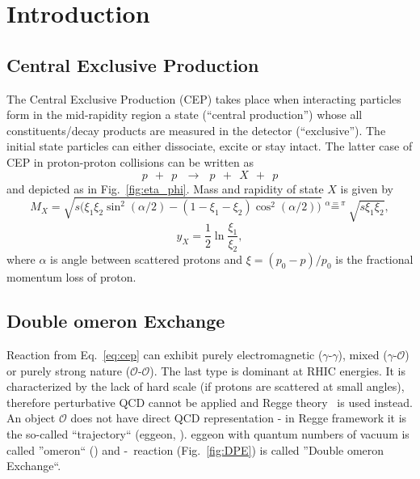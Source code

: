 

\chapter{Introduction}\label{chap:introduction}
\section{Central Exclusive Production}
The Central Exclusive Production (CEP) takes place when interacting particles form in the mid-rapidity region a state (``central production'') whose all constituents/decay products are measured in the detector (``exclusive''). The initial state particles can either dissociate, excite or stay intact. The latter case of CEP in proton-proton collisions can be written as
\begin{equation}\label{eq:cep}%
p~~+~~p~~~\rightarrow~~~p~~+~~X~~+~~p
\end{equation}
and depicted as in Fig.~\ref{fig:eta_phi}. Mass and rapidity of state $X$ is given by
\begin{equation}\label{eq:mass_X}
M_{X} = \sqrt{s\Big(\xi_{1}\xi_{2}\sin^{2}{(\alpha/2)}-(1-\xi_{1}-\xi_{2})\cos^{2}{(\alpha/2)}\Big)} \stackrel{\alpha=\pi}{=} \sqrt{s\xi_{1}\xi_{2}},
\end{equation}
\begin{equation}\label{eq:rapidity_X}
y_{X} = \frac{1}{2}\ln{\frac{\xi_{1}}{\xi_{2}}},
\end{equation}
where $\alpha$ is angle between scattered protons and $\xi=(p_{0}-p)/p_{0}$ is the fractional momentum loss of proton.

\section{Double \Pom omeron Exchange}
Reaction from Eq.~\ref{eq:cep} can exhibit purely electromagnetic ($\gamma$-$\gamma$), mixed ($\gamma$-$\mathcal{O}$) or purely strong nature ($\mathcal{O}$-$\mathcal{O}$). The last type is dominant at RHIC energies. It is characterized by the lack of hard scale (if protons are scattered at small angles), therefore perturbative QCD cannot be applied and Regge theory~\cite{IntroductionToRegge} is used instead. An object $\mathcal{O}$ does not have direct QCD representation - in Regge framework it is the so-called ``trajectory`` (\Reg eggeon, \Reg). \Reg eggeon with quantum numbers of vacuum is called ''\Pom omeron`` (\Pom) and \Pom-\Pom\ reaction (Fig.~\ref{fig:DPE}) is called ''Double \Pom omeron Exchange``. %

